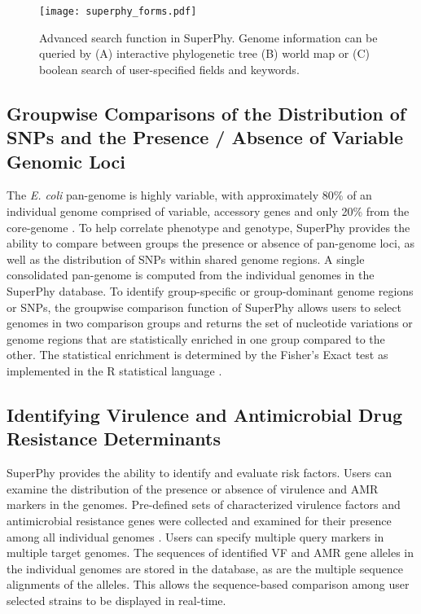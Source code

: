 \documentclass[a4paper,twoside]{article}
\begin{document}
\begin{figure}[t]
  \vspace{-0.2cm}
  \centering
   {\texttt{[image: superphy\_forms.pdf]}}
  \caption{Advanced search function in SuperPhy. Genome information can be queried by (A) interactive phylogenetic tree (B) world map or (C) boolean search of user-specified fields and keywords.}
  \label{fig:search}
\end{figure}


\subsection{Groupwise Comparisons of the Distribution of SNPs and the Presence / Absence of Variable Genomic Loci}

The \textit{E. coli} pan-genome is highly variable, with approximately 80\% of an individual genome comprised of variable, accessory genes and only 20\% from the core-genome \cite{lukjancenko_comparison_2010}. To help correlate phenotype and genotype, SuperPhy provides the ability to compare between groups the presence or absence of pan-genome loci, as well as the distribution of SNPs within shared genome regions. A single consolidated pan-genome is computed from the individual genomes in the SuperPhy database. To identify group-specific or group-dominant genome regions or SNPs, the groupwise comparison function of SuperPhy allows users to select genomes in two comparison groups and returns the set of nucleotide variations or genome regions that are statistically enriched in one group compared to the other. The statistical enrichment is determined by the Fisher's Exact test as implemented in the R statistical language \cite{R_manual}.

\subsection{Identifying Virulence and Antimicrobial Drug Resistance Determinants}

SuperPhy provides the ability to identify and evaluate risk factors. Users can examine the distribution of the presence or absence of virulence and AMR markers in the genomes.  Pre-defined sets of characterized virulence factors and antimicrobial resistance genes were collected and examined for their presence among all individual genomes \cite{mcarthur2012card,chen2012vfdb,chen2005vfdb}. Users can specify multiple query markers in multiple target genomes. The sequences of identified VF and AMR gene alleles in the individual genomes are stored in the database, as are the multiple sequence alignments of the alleles. This allows the sequence-based comparison among user selected strains to be displayed in real-time.
\end{document}
